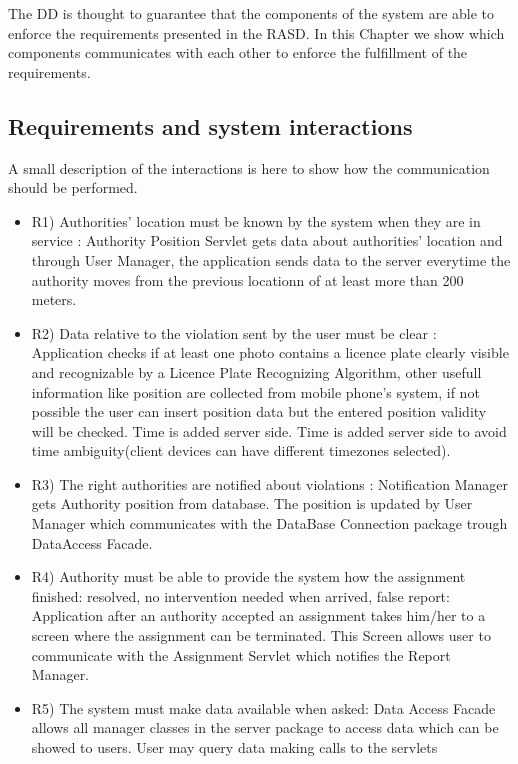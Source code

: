 The DD is thought to guarantee that the components of the system are able to enforce the requirements presented in the RASD.
\newline
In this Chapter we show which components communicates with each other to enforce the fulfillment of the requirements.
\subsection{Requirements and system interactions}
A small description of the interactions is here to show how the communication should be performed.  
\begin{itemize}
 \item R1) Authorities’ location must be known by the system when they are in service : Authority Position Servlet gets data about authorities' location and through User Manager, the  application sends data to the server everytime the authority moves from the previous locationn of at least more than 200 meters.
\item  R2) Data relative to the violation sent by the user must be clear : Application checks if at least one photo contains a licence plate clearly visible and recognizable by a Licence Plate Recognizing Algorithm, other usefull information like position are collected from mobile phone's system, if not possible the user can insert position data but the entered position validity will be checked. Time is added server side. Time is added server side to avoid time ambiguity(client devices can have different timezones selected).
 \item R3) The right authorities are notified about violations : Notification Manager gets Authority position from database. The position is updated by User Manager which communicates with the DataBase Connection package trough DataAccess Facade.
 \item R4) Authority must be able to provide the system how the assignment finished: resolved, no intervention needed when arrived, false report: Application after an authority accepted an assignment takes him/her to a screen where the assignment can be terminated.
This Screen allows user to communicate with the Assignment Servlet which notifies the Report Manager.
 \item R5) The system must make data available when asked: Data Access Facade allows all manager classes in the server package to access data which can be showed to users. User may query data making calls to the servlets

\end{itemize}
